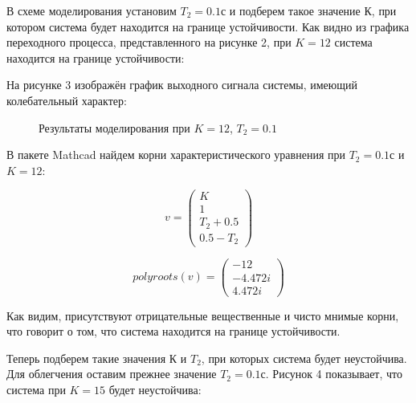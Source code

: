 \documentclass[a4paper, 11pt]{article}
\begin{document}
\par 
	В схеме моделирования установим  $T_2=0.1 с$ и подберем такое значение $К$, при котором система будет находится на границе устойчивости. Как видно из графика переходного процесса, представленного на рисунке 2, при $K = 12$ система находится на границе устойчивости:

\newpage
{}
На рисунке 3 изображён график выходного сигнала системы, имеющий колебательный характер:
\begin{figure}[h!]
\centering
{}
\caption{Результаты моделирования при $K=12$, $T_2=0.1$}
\end{figure}

\par 
	В пакете Mathcad найдем корни характеристического уравнения при $T_2=0.1 с$ и $K=12$:

\begin{equation}
v=\left(
\begin{matrix}

K \\
1 \\
T_2+0.5 \\
0.5-T_2 

\end{matrix}
\right)	
\end{equation}

\begin{equation}
polyroots(v)=\left(
\begin{matrix}
-12 \\
-4.472i \\
4.472i
\end{matrix}
\right)
\end{equation}

\par 	
Как видим, присутствуют отрицательные вещественные и чисто мнимые корни, что говорит о том, что система находится на границе устойчивости.
\par 
Теперь подберем такие значения $К$ и $T_2$, при которых система будет неустойчива. Для облегчения оставим прежнее значение $T_2=0.1 с$. Рисунок 4 показывает, что система при $K = 15$ будет неустойчива:
\end{document}
